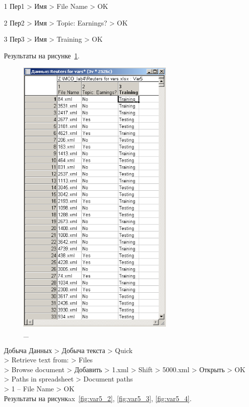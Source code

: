 1 Пер1 > Имя > File Name > OK

2 Пер2 > Имя > Topic: Earnings? > OK

3 Пер3 > Имя > Training > OK

Результаты на рисунке~\ref{fig:var5_1}.

\begin{figure}[!h]
  \centering

  \includegraphics[height=14cm]
  {inc/var5/1.PNG}

  \caption{\_}

  \label{fig:var5_1}
\end{figure}

\newpage

Добыча Данных > Добыча текста > Quick \\
> Retrieve text from: > Files \\
> Browse document > Добавить > 1.xml > Shift > 5000.xml > Открыть > OK \\
> Paths in spreadsheet > Document paths \\
> 1 – File Name > OK \\

Результаты на рисункax~\ref{fig:var5_2}, \ref{fig:var5_3}, \ref{fig:var5_4}.

